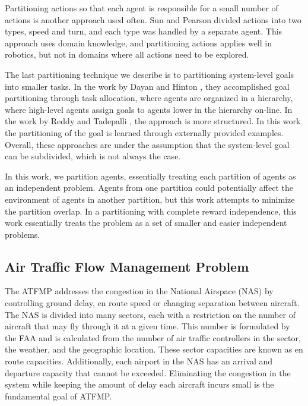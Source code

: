 \documentclass{aamas2014}
\begin{document}
Partitioning actions so that each agent is responsible for a small number of actions is another approach used often. Sun and Pearson \cite{Sun98someexperiments} divided actions into two types, speed and turn, and each type was handled by a separate agent. This approach uses domain knowledge, and partitioning actions applies well in robotics, but not in domains where all actions need to be explored.

The last partitioning technique we describe is to partitioning system-level goals into smaller tasks. In the work by Dayan and Hinton \cite{Dayan93feudalreinforcement}, they accomplished goal partitioning through task allocation, where agents are organized in a hierarchy, where high-level agents assign goals to agents lower in the hierarchy on-line. In the work by Reddy and Tadepalli \cite{Reddy_learninggoal-decomposition}, the approach is more structured. In this work the partitioning of the goal is learned through externally provided examples. Overall, these approaches are under the assumption that the system-level goal can be subdivided, which is not always the case. 

In this work, we partition agents, essentially treating each partition of agents as an independent problem. Agents from one partition could potentially affect the environment of agents in another partition, but this work attempts to minimize the partition overlap. In a partitioning with complete reward independence, this work essentially treats the problem as a set of smaller and easier independent problems.


\subsection{Air Traffic Flow Management Problem}

The ATFMP addresses the congestion in the National Airspace (NAS) by controlling ground delay, en route speed or changing separation between aircraft. The NAS is divided into many sectors, each with a restriction on the number of aircraft that may fly through it at a given time. This number is formulated by the FAA and is calculated from the number of air traffic controllers in the sector, the weather, and the geographic location. These sector capacities are known as en route capacities. Additionally, each airport in the NAS has an arrival and departure capacity that cannot be exceeded. Eliminating the congestion in the system while keeping the amount of delay each aircraft incurs small is the fundamental goal of ATFMP. 
\end{document}
